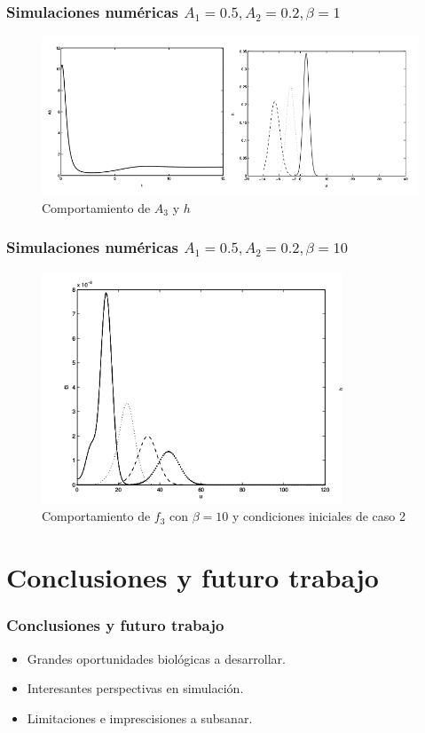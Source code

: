 \documentclass{beamer}
\begin{document}
\begin{frame}
	\frametitle{Simulaciones numéricas $A_1 = 0.5, A_2 = 0.2, \beta = 1$}
	\begin{figure}
		\centering
		\includegraphics[width=1\textwidth]{test2A3H.png}
		\caption{Comportamiento de $A_3$ y $h$}
		\label{fig:ejemplo4}
	\end{figure}
\end{frame}
\begin{frame}
	\frametitle{Simulaciones numéricas $A_1 = 0.5, A_2 = 0.2, \beta = 10$}
	\begin{figure}
		\centering
		\includegraphics[width=0.8\textwidth]{test222.png}
		\caption{Comportamiento de $f_3$ con $\beta=10$ y condiciones iniciales de caso 2}
		\label{fig:ejemplo5}
	\end{figure}
\end{frame}
\section{Conclusiones y futuro trabajo}

\begin{frame}
  \frametitle{Conclusiones y futuro trabajo}

  \begin{itemize}
    \item Grandes oportunidades biológicas a desarrollar.
    \item Interesantes perspectivas en simulación.
    \item Limitaciones e imprescisiones a subsanar.
  \end{itemize}
\end{frame}
\end{document}
